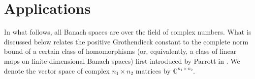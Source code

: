 \documentclass[a4paper,oneside,11pt, reqno]{amsart}
\numberwithin{equation}{section}
\theoremstyle{plain}
\begin{document}
\section{Applications}\label{adde}
In what follows, all Banach spaces are over the field of complex numbers. What is discussed below relates the positive Grothendieck constant to the complete norm bound of a certain class of homomorphisms (or, equivalently, a class of linear maps on finite-dimensional Banach spaces) first introduced by Parrott in \cite{SKP}. We denote the vector space of complex $n_1\times n_2$ matrices by $\mathbb{C}^{n_1\times n_2}.$


\end{document}
